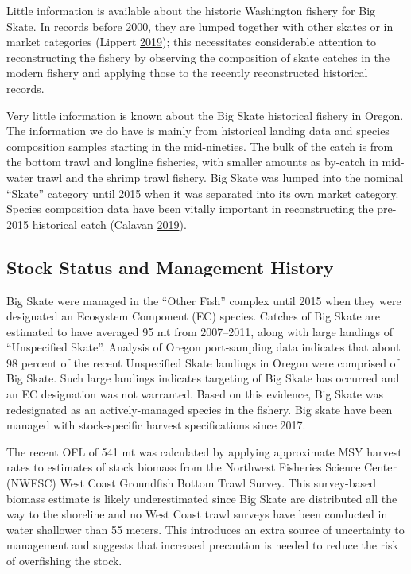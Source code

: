 \documentclass[12pt,]{article}
\begin{document}
Little information is available about the historic Washington fishery
for Big Skate. In records before 2000, they are lumped together with
other skates or in market categories (Lippert
\protect\hyperlink{ref-GregLippert}{2019}); this necessitates
considerable attention to reconstructing the fishery by observing the
composition of skate catches in the modern fishery and applying those to
the recently reconstructed historical records.

Very little information is known about the Big Skate historical fishery
in Oregon. The information we do have is mainly from historical landing
data and species composition samples starting in the mid-nineties. The
bulk of the catch is from the bottom trawl and longline fisheries, with
smaller amounts as by-catch in mid-water trawl and the shrimp trawl
fishery. Big Skate was lumped into the nominal ``Skate'' category until
2015 when it was separated into its own market category. Species
composition data have been vitally important in reconstructing the
pre-2015 historical catch (Calavan
\protect\hyperlink{ref-TedCalavan}{2019}).

\hypertarget{stock-status-and-management-history}{%
\subsection{Stock Status and Management
History}\label{stock-status-and-management-history}}

Big Skate were managed in the ``Other Fish'' complex until 2015 when
they were designated an Ecosystem Component (EC) species. Catches of Big
Skate are estimated to have averaged 95 mt from 2007--2011, along with
large landings of ``Unspecified Skate''. Analysis of Oregon
port-sampling data indicates that about 98 percent of the recent
Unspecified Skate landings in Oregon were comprised of Big Skate. Such
large landings indicates targeting of Big Skate has occurred and an EC
designation was not warranted. Based on this evidence, Big Skate was
redesignated as an actively-managed species in the fishery. Big skate
have been managed with stock-specific harvest specifications since 2017.

The recent OFL of 541 mt was calculated by applying approximate MSY
harvest rates to estimates of stock biomass from the Northwest Fisheries
Science Center (NWFSC) West Coast Groundfish Bottom Trawl Survey. This
survey-based biomass estimate is likely underestimated since Big Skate
are distributed all the way to the shoreline and no West Coast trawl
surveys have been conducted in water shallower than 55 meters. This
introduces an extra source of uncertainty to management and suggests
that increased precaution is needed to reduce the risk of overfishing
the stock.
\end{document}
